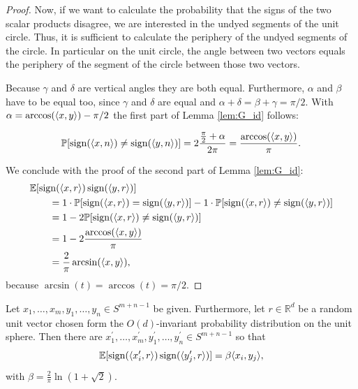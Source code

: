 \begin{proof}
\begin{minipage}{\textwidth}
		\hspace{12pt} Now, if we want to calculate the probability that the signs of the two scalar products disagree, we are interested in the undyed segments of the unit circle. Thus, it is sufficient to calculate the periphery of the undyed segments of the circle. In particular on the unit circle, the angle between two vectors equals the periphery of the segment of the circle between those two vectors. 
			
		\hspace{12pt} Because $\gamma$ and $\delta$ are vertical angles they are both equal. Furthermore, $\alpha$ and $\beta$ have to be equal too, since $\gamma$ and $\delta$ are equal and $\alpha+\delta = \beta+\gamma = \pi/2$. With $\alpha = \arccos(\langle{x},{y}\rangle) - \pi/2$ the first part of Lemma \ref{lem:G_id} follows:
	\end{minipage}
	
	\begin{align*}
		\mathbb{P}[\operatorname{sign}(\langle{x},{n}\rangle)\neq\operatorname{sign}(\langle{y},{n}\rangle)]=2\frac{\frac{\pi}{2}+\alpha}{2\pi} = \frac{\arccos(\langle{x},{y}\rangle)}{\pi}.
	\end{align*}
	
	\noindent We conclude with the proof of the second part of Lemma \ref{lem:G_id}: 
	\begin{align*}
		&\mathbb{E}[\operatorname{sign}(\langle{x},{r}\rangle) \operatorname{sign}(\langle{y},{r}\rangle)] \\
		&\qquad= 1\cdot\mathbb{P}[\operatorname{sign}(\langle{x},{r}\rangle) = \operatorname{sign} (\langle{y},{r}\rangle )] - 1\cdot \mathbb{P}[\operatorname{sign}(\langle{x},{r}\rangle) \neq \operatorname{sign}(\langle{y},{r}\rangle)] \\
		&\qquad= 1 - 2\mathbb{P}[\operatorname{sign}(\langle{x},{r}\rangle) \neq \operatorname{sign}(\langle{y},{r}\rangle)] \\
		&\qquad= 1 - 2 \frac{\arccos(\langle{x},{y}\rangle)}{\pi} \\
		&\qquad= \frac{2}{\pi} \arcsin(\langle{x},{y}\rangle),
	\end{align*}
	because $\arcsin (t) = \arccos(t) = \pi/2$.
\end{proof}

\begin{lemma}\label{lem:krivines_trick}
	Let $x_1,\dots,x_m,y_1,\dots,y_n\in S^{m+n-1}$ be given. Furthermore, let $r\in\mathbb{R}^d$ be a random unit vector chosen form the $O(d)$-invariant probability distribution on the unit sphere. Then there are $x_1^\prime,\dots,x_m^\prime, y_1^\prime,\dots,y_n^\prime\in S^{m+n-1}$ so that
	\begin{equation}
		\mathbb{E}[\operatorname{sign}(\langle{x_i^\prime},{r}\rangle)\operatorname{sign}(\langle{y_j^\prime},{r}\rangle)] = \beta \langle{x_i},{y_j}\rangle,
		\label{eq:krivines_trick}
	\end{equation}		
	with $\beta = \frac{2}{\pi} \ln (1+\sqrt{2}).$
\end{lemma}

